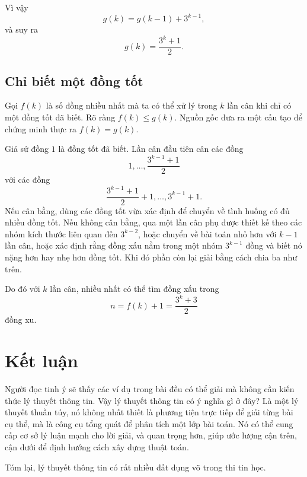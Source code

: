 \documentclass[11pt]{article}
\begin{document}
Vì vậy
\[
  g(k)=g(k-1)+3^{k-1},
\]
và suy ra
\[
  g(k)=\frac{3^k+1}{2}.
\]

\subsection{Chỉ biết một đồng tốt}

Gọi \(f(k)\) là số đồng nhiều nhất mà ta có thể xử lý trong \(k\) lần cân khi
chỉ có một đồng tốt đã biết. Rõ ràng \(f(k)\le g(k)\). Nguồn gốc đưa ra một
cấu tạo để chứng minh thực ra \(f(k)=g(k)\).

Giả sử đồng \(1\) là đồng tốt đã biết. Lần cân đầu tiên cân các đồng
\[
  1,\ldots,\frac{3^{k-1}+1}{2}
\]
với các đồng
\[
  \frac{3^{k-1}+1}{2}+1,\ldots,3^{k-1}+1.
\]
Nếu cân bằng, dùng các đồng tốt vừa xác định để chuyển về tình huống có đủ
nhiều đồng tốt. Nếu không cân bằng, qua một lần cân phụ được thiết kế theo
các nhóm kích thước liên quan đến \(3^{k-2}\), hoặc chuyển về bài toán nhỏ
hơn với \(k-1\) lần cân, hoặc xác định rằng đồng xấu nằm trong một nhóm
\(3^{k-1}\) đồng và biết nó nặng hơn hay nhẹ hơn đồng tốt. Khi đó phần còn lại
giải bằng cách chia ba như trên.

Do đó với \(k\) lần cân, nhiều nhất có thể tìm đồng xấu trong
\[
  n=f(k)+1=\frac{3^k+3}{2}
\]
đồng xu.

\section{Kết luận}

Người đọc tinh ý sẽ thấy các ví dụ trong bài đều có thể giải mà không cần
kiến thức lý thuyết thông tin. Vậy lý thuyết thông tin có ý nghĩa gì ở đây?
Là một lý thuyết thuần túy, nó không nhất thiết là phương tiện trực tiếp để
giải từng bài cụ thể, mà là công cụ tổng quát để phân tích một lớp bài toán.
Nó có thể cung cấp cơ sở lý luận mạnh cho lời giải, và quan trọng hơn, giúp
ước lượng cận trên, cận dưới để định hướng cách xây dựng thuật toán.

Tóm lại, lý thuyết thông tin có rất nhiều đất dụng võ trong thi tin học.
\end{document}
